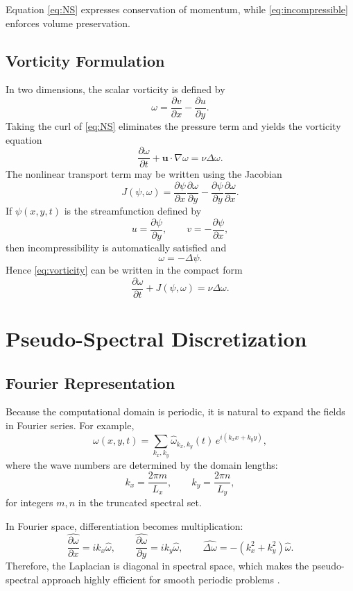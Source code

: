 \documentclass[11pt]{article}
\begin{document}
Equation \eqref{eq:NS} expresses conservation of momentum, while \eqref{eq:incompressible} enforces volume preservation.

\subsection{Vorticity Formulation}

In two dimensions, the scalar vorticity is defined by
\[
\omega = \frac{\partial v}{\partial x} - \frac{\partial u}{\partial y}.
\]
Taking the curl of \eqref{eq:NS} eliminates the pressure term and yields the vorticity equation
\begin{equation}
\frac{\partial \omega}{\partial t} + \mathbf{u}\cdot\nabla \omega = \nu \Delta \omega.
\label{eq:vorticity}
\end{equation}
The nonlinear transport term may be written using the Jacobian
\[
J(\psi,\omega) = \frac{\partial \psi}{\partial x}\frac{\partial \omega}{\partial y}
- \frac{\partial \psi}{\partial y}\frac{\partial \omega}{\partial x}.
\]
If $\psi(x,y,t)$ is the streamfunction defined by
\[
u = \frac{\partial \psi}{\partial y}, \qquad v = -\frac{\partial \psi}{\partial x},
\]
then incompressibility is automatically satisfied and
\[
\omega = -\Delta \psi.
\]
Hence \eqref{eq:vorticity} can be written in the compact form
\begin{equation}
\frac{\partial \omega}{\partial t} + J(\psi,\omega) = \nu \Delta \omega.
\label{eq:vorticity_jacobian}
\end{equation}

\section{Pseudo-Spectral Discretization}

\subsection{Fourier Representation}

Because the computational domain is periodic, it is natural to expand the fields in Fourier series. For example,
\[
\omega(x,y,t) = \sum_{k_x,k_y} \widehat{\omega}_{k_x,k_y}(t)
\,e^{i(k_x x + k_y y)},
\]
where the wave numbers are determined by the domain lengths:
\[
k_x = \frac{2\pi m}{L_x}, \qquad k_y = \frac{2\pi n}{L_y},
\]
for integers $m,n$ in the truncated spectral set.

In Fourier space, differentiation becomes multiplication:
\[
\widehat{\frac{\partial \omega}{\partial x}} = i k_x \widehat{\omega}, 
\qquad
\widehat{\frac{\partial \omega}{\partial y}} = i k_y \widehat{\omega},
\qquad
\widehat{\Delta \omega} = -(k_x^2+k_y^2)\widehat{\omega}.
\]
Therefore, the Laplacian is diagonal in spectral space, which makes the pseudo-spectral approach highly efficient for smooth periodic problems \cite{canuto2006, boyd2001}.
\end{document}
